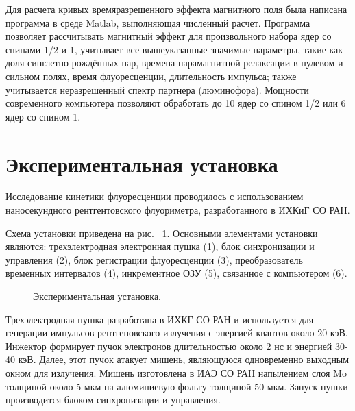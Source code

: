 \documentclass[14pt,titlepage]{extarticle}
\let\oldsection\section
\renewcommand{\section}{\newpage\oldsection}
\begin{document}
Для расчета кривых времяразрешенного эффекта магнитного поля была написана программа в среде Matlab, выполняющая численный расчет. Программа позволяет рассчитывать магнитный эффект для произвольного набора ядер со спинами 1/2 и 1, учитывает все вышеуказанные значимые параметры, такие как доля синглетно-рождённых пар, времена парамагнитной релаксации в нулевом и сильном полях, время флуоресценции, длительность импульса; также учитывается неразрешенный спектр партнера (люминофора). Мощности современного компьютера позволяют обработать до 10 ядер со спином 1/2 или 6 ядер со спином 1.

\oldsection{Экспериментальная установка}
Исследование кинетики флуоресценции проводилось с использованием наносекундного рентгентовского флуориметра, разработанного в ИХКиГ СО РАН.

Схема установки приведена на рис. ~\ref{ris:exp_setup}. Основными элементами установки являются: трехэлектродная электронная пушка (1), блок синхронизации и управления (2), блок регистрации флуоресценции (3), преобразователь временных интервалов (4), инкрементное ОЗУ (5), связанное с компьютером (6).

\begin{figure}
\caption{Экспериментальная установка.}
\label{ris:exp_setup}
\end{figure}


Трехэлектродная пушка разработана в ИХКГ СО РАН и используется для генерации импульсов рентгеновского излучения с энергией квантов около 20 кэВ. Инжектор формирует пучок электронов длительностью около 2 нс и энергией 30-40 кэВ. Далее, этот пучок атакует мишень, являющуюся одновременно выходным окном для излучения. Мишень изготовлена в ИАЭ СО РАН напылением слоя Mo толщиной около 5 мкм на алюминиевую фольгу толщиной 50 мкм. Запуск пушки производится блоком синхронизации и управления.
\end{document}

